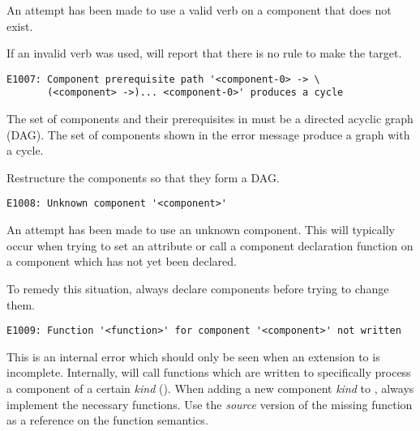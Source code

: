 An attempt has been made to use a valid \lmsbw verb on a component
that does not exist.

If an invalid verb was used, \lmsbw will report that there is no rule
to make the target.


\begin{footnotesize}
\begin{verbatim}
E1007: Component prerequisite path '<component-0> -> \
       (<component> ->)... <component-0>' produces a cycle
\end{verbatim}
\end{footnotesize}

The set of components and their prerequisites in \lmsbw must be a
directed acyclic graph (DAG).  The set of components shown in the
error message produce a graph with a cycle.

Restructure the components so that they form a DAG.


\begin{footnotesize}
\begin{verbatim}
E1008: Unknown component '<component>'
\end{verbatim}
\end{footnotesize}

An attempt has been made to use an unknown component.  This will
typically occur when trying to set an attribute or call a component
declaration function on a component which has not yet been declared.

To remedy this situation, always declare components before trying to
change them.


\begin{footnotesize}
\begin{verbatim}
E1009: Function '<function>' for component '<component>' not written
\end{verbatim}
\end{footnotesize}

This is an internal error which should only be seen when an extension
to \lmsbw is incomplete.  Internally, \lmsbw will call functions which
are written to specifically process a component of a certain
\emph{kind} ().  When adding a new component
\emph{kind} to \lmsbw, always implement the necessary functions.  Use
the \emph{source} version of the missing function as a reference on
the function semantics.

